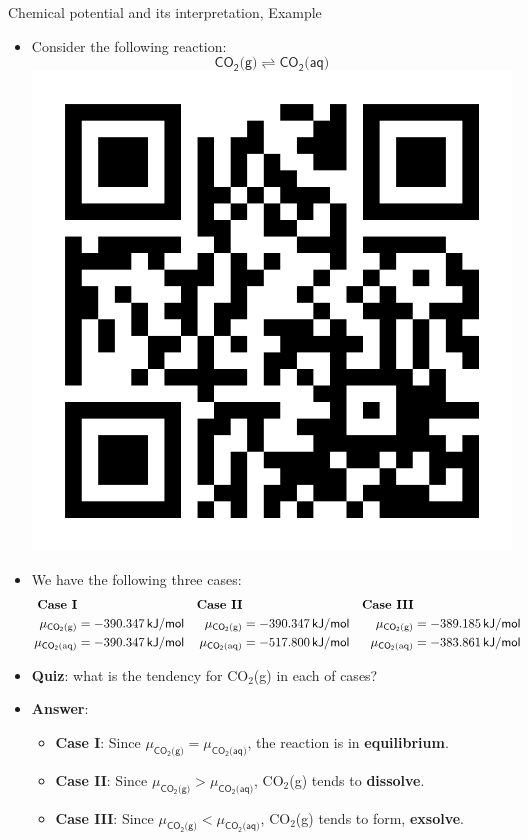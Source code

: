 \begin{frame}{Chemical potential and its interpretation, Example}
\begin{itemize}
\item Consider the following reaction:
\[
\mathsf{CO_{2}\text{(g)}\rightleftharpoons CO_{2}\text{(aq)}}
\]
\vskip -50pt
\includegraphics[height=0.17\columnwidth,right]{figures/chemical-equilibrium/poll.png}
\pause
\vskip -40pt
\item We have the following three cases: 
{
\footnotesize{}
\begin{align*}
\text{\textbf{Case I}} &  & \textbf{Case II} &  & \textbf{Case III}\\
\mu_{\mathsf{CO_{2}\text{(g)}}} & = -390.347\,{\mathsf{kJ/mol}} & 
\mu_{\mathsf{CO_{2}\text{(g)}}} & = -390.347\,{\mathsf{kJ/mol}} & 
\mu_{\mathsf{CO_{2}\text{(g)}}} & = -389.185\,{\mathsf{kJ/mol}}\\
\mu_{\mathsf{CO_{2}\text{(aq)}}} & = -390.347\,{\mathsf{kJ/mol}} & \mu_{\mathsf{CO_{2}\text{(aq)}}} & = -517.800\,{{\mathsf{kJ/mol}}} & \mu_{\mathsf{CO_{2}\text{(aq)}}} & =-383.861\,{\mathsf{kJ/mol}}
\end{align*}
}{\footnotesize\par}
\vskip 10pt 
%
\pause
\item \alert{\textbf{Quiz}}: what is the tendency for CO$_{2}$(g) in each of cases?
%
\hiddenpause

\item \alert{\textbf{Answer}}:
\begin{itemize}
\item \textbf{Case I}: Since $\mu_{\mathsf{CO_{2}\text{(g)}}}=\mu_{\mathsf{CO_{2}\text{(aq)}}}$,
the reaction is in \textbf{equilibrium}.
\item \textbf{Case II}: Since $\mu_{\mathsf{CO_{2}\text{(g)}}}>\mu_{\mathsf{CO_{2}\text{(aq)}}}$,
CO$_{2}$(g) tends to \textbf{dissolve}.
\item \textbf{Case III}: Since $\mu_{\mathsf{CO_{2}\text{(g)}}}<\mu_{\mathsf{CO_{2}\text{(aq)}}}$,
CO$_{2}$(g) tends to form, \textbf{exsolve}. 
\end{itemize}
\end{itemize}

\end{frame}
